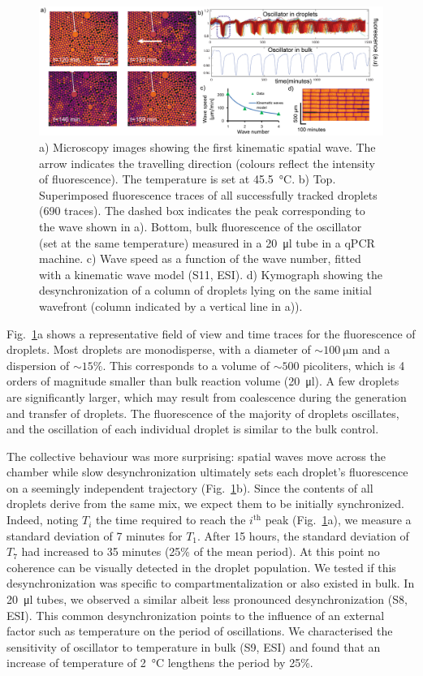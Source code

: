 \documentclass[prl,reprint, amsmath,amssymb,superscriptaddress]{revtex4-1}
\begin{document}
\begin{figure}
\includegraphics[width=\textwidth]{oscillations}
\caption{a) Microscopy images showing the first kinematic spatial wave. The arrow indicates the travelling direction (colours reflect the intensity of fluorescence).  The temperature is set at \SI{45.5}{\celsius}. b) Top. Superimposed fluorescence traces of all successfully tracked droplets (690 traces). The dashed box indicates the peak corresponding to the wave shown in a). Bottom, bulk fluorescence of the oscillator (set at the same temperature) measured in a \SI{20}{\micro\litre} tube in a qPCR machine. c) Wave speed as a function of the wave number, fitted with a kinematic wave model (S11, ESI). d) Kymograph showing the desynchronization of a column of droplets lying on the same initial wavefront (column indicated by a vertical line in a)). }
\label{fig:oscillations}
\end{figure}

	Fig.~\ref{fig:oscillations}a shows a representative field of view and time traces for the fluorescence of droplets. Most droplets are monodisperse, with a diameter of $\sim\SI{100}{\micro\metre}$ and a dispersion of $\sim15\%$. This corresponds to a volume of $\sim 500$ picoliters, which is 4 orders of magnitude smaller than bulk reaction volume (\SI{20}{\micro\litre}). A few droplets are significantly larger, which may result from coalescence during the generation and transfer of droplets. The fluorescence of the majority of droplets oscillates, and the oscillation of each individual droplet is similar to the bulk control.
	
	The collective behaviour was more surprising: spatial waves move across the chamber while slow desynchronization ultimately sets each droplet’s fluorescence on a seemingly independent trajectory (Fig.~\ref{fig:oscillations}b). 
Since the contents of all droplets derive from the same mix, we expect them to be initially synchronized. Indeed, noting $T_i$ the time required to reach the $i^\text{th}$ peak (Fig.~\ref{fig:oscillations}a), we measure a standard deviation of 7 minutes for $T_1$. After 15 hours, the standard deviation of $T_7$ had increased to 35 minutes (25\% of the mean period). At this point no coherence can be visually detected in the droplet population. We tested if this desynchronization was specific to compartmentalization or also existed in bulk. In \SI{20}{\micro\litre} tubes, we observed a similar albeit less pronounced desynchronization (S8, ESI). This common desynchronization points to the influence of an external factor such as temperature on the period of oscillations. We characterised the sensitivity of oscillator to temperature in bulk (S9, ESI) and found that an increase of temperature of \SI{2}{\celsius} lengthens the period by 25\%.
\end{document}
